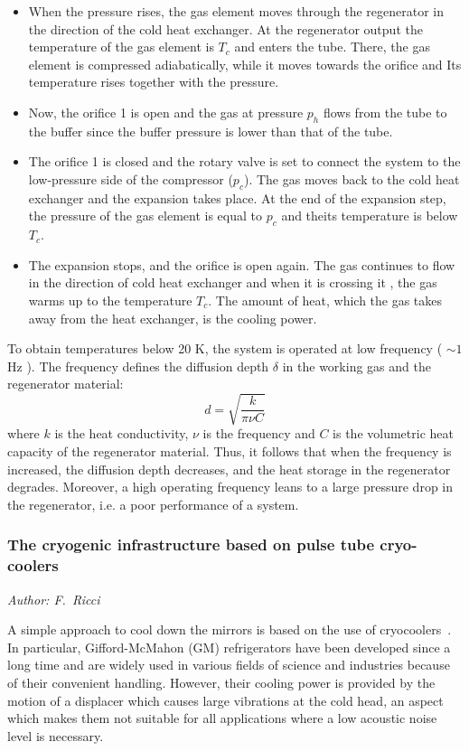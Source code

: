 {\begin{itemize}
\item{When the pressure rises, the gas element moves through the regenerator in the direction of the cold heat exchanger. At the regenerator output  the temperature of the gas element is $T_c$ and enters the tube. There, the gas element is compressed adiabatically, while it moves towards the orifice and  Its temperature rises together with the pressure.}
\item{Now, the orifice 1 is open and  the gas  at pressure $p_h$ flows from the tube to the buffer since  the buffer pressure is lower than that of the tube.}
\item{ The orifice 1 is closed and the rotary valve is set to connect the system to the low-pressure side of the compressor ($p_c$). The gas moves back to the cold heat exchanger and the expansion takes place.  At the end of the expansion step, the pressure of the gas element is equal to $p_c$  and theits temperature is below $T_c$.}
\item{The expansion stops, and the orifice is open again. The gas continues to flow in the direction of  cold heat exchanger and when it is crossing it , the gas warms up to the temperature $T_c$. The amount of heat, which the gas takes away from the heat exchanger, is the cooling power.}
\end{itemize}
To obtain temperatures below 20 K, the system is  operated at low frequency ( $\sim 1$ Hz ).
The frequency defines the diffusion depth $\delta$ in the working gas and the regenerator material:
$$d = \sqrt{\frac {k}{\pi \nu C}}$$
\noindent where $k$ is the heat conductivity, $\nu$ is the frequency and $C$ is the volumetric heat capacity of the regenerator material. Thus, it follows that when the frequency is increased, the diffusion depth decreases, and the heat storage in the regenerator degrades.
Moreover, a high operating frequency leans to a large pressure drop in the regenerator, i.e. a poor performance of a system.}
\FloatBarrier
 \subsubsection{The cryogenic infrastructure based on pulse tube cryo-coolers}
 \label{sec:cryocoolers}
\emph{
Author: F.\ Ricci}

A simple approach to cool down the mirrors  is based on the use of cryocoolers~\cite{LCGT}. In particular,  
Gifford-McMahon (GM) refrigerators have been developed since a long time and are widely used in various fields of science and industries because of their convenient handling. 
However, their cooling power  is provided by the motion of a displacer which causes large vibrations at the cold head, an aspect which makes them not suitable for all applications where a low acoustic noise level is necessary.

